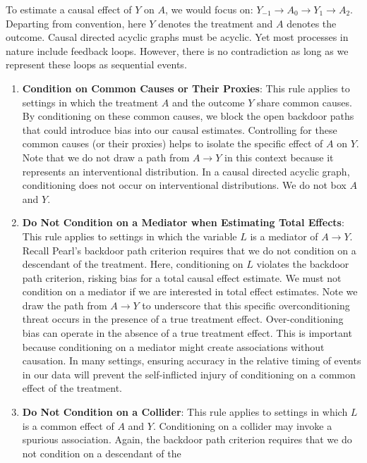 \documentclass[
  single column]{article}
\begin{document}
To estimate a causal effect of \(Y\) on \(A\), we would focus on:
\(\boxed{Y_{-1}} \to \boxed{A_0} \to Y_1 \rightarrow A_2\). Departing
from convention, here \(Y\) denotes the treatment and \(A\) denotes the
outcome. Causal directed acyclic graphs must be acyclic. Yet most
processes in nature include feedback loops. However, there is no
contradiction as long as we represent these loops as sequential events.

\begin{enumerate}
\def\labelenumi{\arabic{enumi}.}
\setcounter{enumi}{1}
\item
  \textbf{Condition on Common Causes or Their Proxies}: This rule
  applies to settings in which the treatment \(A\) and the outcome \(Y\)
  share common causes. By conditioning on these common causes, we block
  the open backdoor paths that could introduce bias into our causal
  estimates. Controlling for these common causes (or their proxies)
  helps to isolate the specific effect of \(A\) on \(Y\). Note that we
  do not draw a path from \(A \to Y\) in this context because it
  represents an interventional distribution. In a causal directed
  acyclic graph, conditioning does not occur on interventional
  distributions. We do not box \(A\) and \(Y\).
\item
  \textbf{Do Not Condition on a Mediator when Estimating Total Effects}:
  This rule applies to settings in which the variable \(L\) is a
  mediator of \(A \to Y\). Recall Pearl's backdoor path criterion
  requires that we do not condition on a descendant of the treatment.
  Here, conditioning on \(L\) violates the backdoor path criterion,
  risking bias for a total causal effect estimate. We must not condition
  on a mediator if we are interested in total effect estimates. Note we
  draw the path from \(A \to Y\) to underscore that this specific
  overconditioning threat occurs in the presence of a true treatment
  effect. Over-conditioning bias can operate in the absence of a true
  treatment effect. This is important because conditioning on a mediator
  might create associations without causation. In many settings,
  ensuring accuracy in the relative timing of events in our data will
  prevent the self-inflicted injury of conditioning on a common effect
  of the treatment.
\item
  \textbf{Do Not Condition on a Collider}: This rule applies to settings
  in which \(L\) is a common effect of \(A\) and \(Y\). Conditioning on
  a collider may invoke a spurious association. Again, the backdoor path
  criterion requires that we do not condition on a descendant of the

\end{enumerate}
\end{document}

